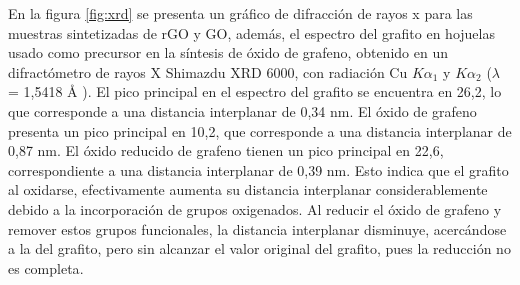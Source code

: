 En la figura \ref{fig:xrd} se presenta un gráfico de difracción de rayos x para las muestras sintetizadas de rGO y GO, además, el espectro del grafito en hojuelas usado como precursor en la síntesis de óxido de grafeno, obtenido en un difractómetro de rayos X Shimazdu XRD 6000, con radiación Cu $K\alpha_1$ y $K\alpha_2$ ($\lambda$ = 1,5418 \AA{} ). El pico principal en el espectro del grafito se encuentra en 26,2\degree, lo que corresponde a una distancia interplanar de 0,34 nm. El óxido de grafeno presenta un pico principal en 10,2\degree, que corresponde a una distancia interplanar de 0,87 nm. El óxido reducido de grafeno tienen un pico principal en 22,6\degree, correspondiente a una distancia interplanar de 0,39 nm. Esto indica que el grafito al oxidarse, efectivamente aumenta su distancia interplanar considerablemente debido a la incorporación de grupos oxigenados. Al reducir el óxido de grafeno y remover estos grupos funcionales, la distancia interplanar disminuye, acercándose a la del grafito, pero sin alcanzar el valor original del grafito, pues la reducción no es completa\citep{Guo2009, Marcano2010, Park2011, Li2014, Stobinski2014, Xu2014a, Yang2014, Abdolhosseinzadeh2015}.

